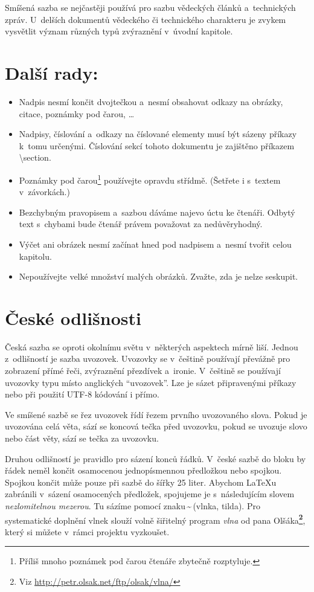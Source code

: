 \documentclass[twocolumn, a4paper, 10pt, notitlepage]{article}
\newcommand{\fontCMTT}[1]{\fontfamily{cmtt}\selectfont #1}
\begin{document}
Smíšená sazba se nejčastěji používá pro sazbu vě\-dec\-kých článků a~technických zpráv. U~delších dokumentů vědeckého či technického charakteru je zvykem vysvětlit význam různých typů zvýraznění v~úvodní kapitole.

\section{Další rady:} \label{sec:section3}
\begin{itemize}
    \item Nadpis nesmí končit dvojtečkou a~nesmí obsahovat odkazy na obrázky, citace, poznámky pod čarou, \ldots
    \item Nadpisy, číslování a~odkazy na číslované elementy musí být sázeny příkazy k~tomu určenými. Čí\-slo\-vá\-ní sekcí tohoto dokumentu je zajištěno příkazem {\fontCMTT{\textbackslash section}}.
    \item Poznámky pod čarou\footnote{Příliš mnoho poznámek pod čarou čtenáře zbytečně rozptyluje.} používejte opravdu střídmě. (Šetřete i s~textem v~závorkách.)
    \item Bezchybným pravopisem a~sazbou dáváme najevo úctu ke čtenáři. Odbytý text s~chybami bude čtenář právem považovat za nedůvěryhodný.
    \item Výčet ani obrázek nesmí začínat hned pod nadpisem a~nesmí tvořit celou kapitolu.
    \item Nepoužívejte velké množství malých obrázků. Zvažte, zda je nelze seskupit.
\end{itemize}

\section{České odlišnosti}

Česká sazba se oproti okolnímu světu v~některých as\-pek\-tech mírně liší. Jednou z~odlišností je sazba uvozovek. U\-vo\-zov\-ky se v~češtině používají převážně pro zobrazení přímé řeči, zvýraznění přezdívek a~ironie. V~češtině se používají uvozovky typu  místo anglických ``uvozovek''. Lze je sázet připravenými příkazy nebo při použití UTF-8 kó\-do\-vá\-ní i přímo.

Ve smíšené sazbě se řez uvozovek řídí řezem prvního uvozovaného slova. Pokud je uvozována celá věta, sází se koncová tečka před uvozovku, pokud se uvozuje slovo nebo část věty, sází se tečka za uvozovku.

Druhou odlišností je pravidlo pro sázení konců řádků. V~české sazbě do bloku by řádek neměl končit o\-sa\-mo\-ce\-nou jednopísmennou předložkou nebo spojkou. Spojkou  končit může pouze při sazbě do šířky 25 liter. Abychom {\LaTeX}u zabránili v~sázení osamocených předložek, spo\-ju\-je\-me je s~následujícím slovem \emph{nezlomitelnou mezerou}. Tu sázíme pomocí znaku\,{\textasciitilde}\,(vlnka, tilda). Pro systematické do\-pl\-ně\-ní vlnek slouží volně šiřitelný program \emph{vlna} od pana Olšáka\textbf{\footnote{Viz \href{http://petr.olsak.net/ftp/olsak/vlna/}{\fontCMTT{http://petr.olsak.net/ftp/olsak/vlna/}}}}, který si můžete v~rámci projektu vyzkoušet.
\end{document}
